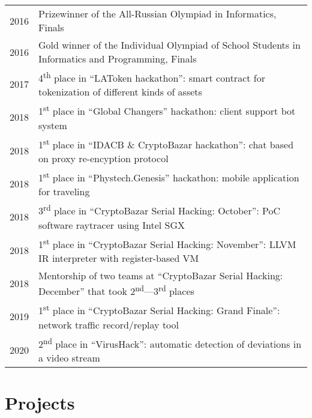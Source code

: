\documentclass[10pt]{article}
\begin{document}
\begin{tabular}{ l l }
    2016 & Prizewinner of the All-Russian Olympiad in Informatics, Finals \\
    2016 & Gold winner of the Individual Olympiad of School Students in Informatics and Programming, Finals \\
    2017 & 4\textsuperscript{th} place in ``LAToken hackathon'': smart contract for tokenization of different kinds of assets \\
    2018 & 1\textsuperscript{st} place in ``Global Changers'' hackathon: client support bot system \\
    2018 & 1\textsuperscript{st} place in ``IDACB \& CryptoBazar hackathon'': chat based on proxy re-encyption protocol \\
    2018 & 1\textsuperscript{st} place in ``Phystech.Genesis'' hackathon: mobile application for traveling \\
    2018 & 3\textsuperscript{rd} place in ``CryptoBazar Serial Hacking: October'': PoC software raytracer using Intel SGX \\
    2018 & 1\textsuperscript{st} place in ``CryptoBazar Serial Hacking: November'': LLVM IR interpreter with register-based VM \\
    2018 & Mentorship of two teams at ``CryptoBazar Serial Hacking: December'' that took 2\textsuperscript{nd}---3\textsuperscript{rd} places \\
    2019 & 1\textsuperscript{st} place in ``CryptoBazar Serial Hacking: Grand Finale'': network traffic record/replay tool \\
    2020 & 2\textsuperscript{nd} place in ``VirusHack'': automatic detection of deviations in a video stream \\
\end{tabular}

\medskip

\section{Projects}
\end{document}
